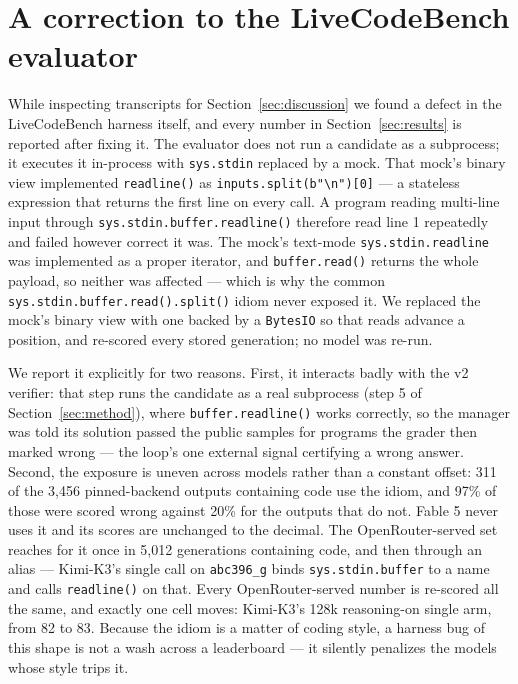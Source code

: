 \documentclass{article}
\begin{document}
\section{A correction to the LiveCodeBench evaluator}
\label{app:evaluator}

While inspecting transcripts for Section~\ref{sec:discussion} we found a defect in the
LiveCodeBench harness itself, and every number in Section~\ref{sec:results} is reported after
fixing it. The evaluator does not run a candidate as a subprocess; it executes it in-process with
\texttt{sys.stdin} replaced by a mock. That mock's binary view implemented \texttt{readline()} as
\texttt{inputs.split(b"\textbackslash n")[0]} --- a stateless expression that returns the
first line on every call. A program reading multi-line input through
\texttt{sys.stdin.buffer.readline()} therefore read line 1 repeatedly and failed however correct it
was. The mock's text-mode \texttt{sys.stdin.readline} was implemented as a proper iterator, and
\texttt{buffer.read()} returns the whole payload, so neither was affected --- which is why the
common \texttt{sys.stdin.buffer.read().split()} idiom never exposed it. We replaced the mock's
binary view with one backed by a \texttt{BytesIO} so that reads advance a position, and re-scored
every stored generation; no model was re-run.

We report it explicitly for two reasons. First, it interacts badly with the v2 verifier: that step
runs the candidate as a real subprocess (step 5 of Section~\ref{sec:method}), where
\texttt{buffer.readline()} works correctly, so the manager was told its solution passed the public
samples for programs the grader then marked wrong --- the loop's one external signal certifying a
wrong answer. Second, the exposure is uneven across models rather than a constant offset: 311 of the
3{,}456 pinned-backend outputs containing code use the idiom, and 97\% of those were scored wrong
against 20\% for the outputs that do not. Fable 5 never uses it and its scores are unchanged to the
decimal. The OpenRouter-served set reaches for it once in 5{,}012 generations containing code, and
then through an alias --- Kimi-K3's single call on \texttt{abc396\_g} binds
\texttt{sys.stdin.buffer} to a name and calls \texttt{readline()} on that. Every OpenRouter-served
number is re-scored all the same, and exactly one cell moves: Kimi-K3's 128k reasoning-on single
arm, from 82 to 83. Because the idiom is a matter of coding style, a harness bug of this shape is
not a wash across a leaderboard --- it silently penalizes the models whose style trips it.
\end{document}
